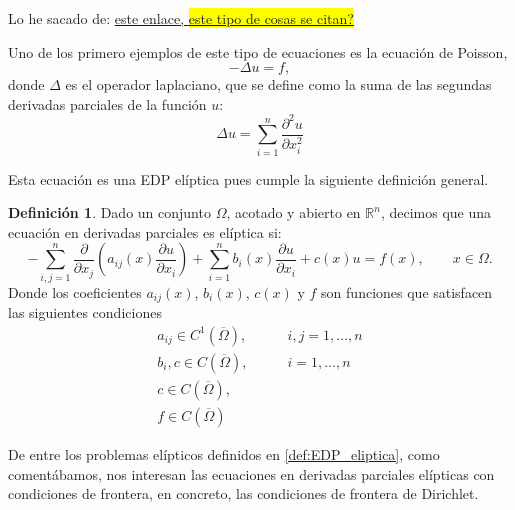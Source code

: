 \documentclass[a4paper,11pt,spanish, twoside, leqno]{tfg-uam}
\theoremstyle{definition}
\newtheorem{defin}[teor]{Definici\'on}
\begin{document}
Lo he sacado de: \href{https://www.ugr.es/~prodelas/ftp/ETSICCP/Resoluci%F3nNum%E9ricaEDPs.pdf}{este enlace, \colorbox{yellow}{este tipo de cosas se citan?}}


Uno de los primero ejemplos de este tipo de ecuaciones es la ecuación de Poisson,
\begin{equation*}
    -\Delta  u = f,
\end{equation*}
donde $\Delta$ es el operador laplaciano, que se define como la suma de las segundas derivadas parciales de la función $u$:
\begin{equation*}
    \Delta u = \sum_{i=1}^{n}\frac{\partial^2 u}{\partial x_i^2}
\end{equation*}

Esta ecuación es una EDP elíptica pues cumple la siguiente definición general.


\begin{mdframed}
\begin{defin}
    Dado un conjunto $\Omega$, acotado y abierto en $\mathbb{R}^n$, decimos que una ecuación en derivadas parciales es elíptica si:
    \begin{equation}
        -\sum_{i,j=1}^{n} \frac{\partial}{\partial x_j}\left( a_{ij}(x)\frac{\partial u}{\partial x_i}\right) + \sum_{i=1}^{n} b_i(x)\frac{\partial u}{\partial x_i} + c(x)u = f(x), \qquad x\in\Omega.
    \end{equation}
    Donde los coeficientes $a_{ij}(x)$, $b_i(x)$, $c(x)$ y $f$ son funciones que satisfacen las siguientes condiciones
    \begin{align}
        a_{ij} \in C^1(\overline{\Omega}),& \qquad i,j = 1, \dots ,n \\
        b_i, c \in C(\overline{\Omega}),& \qquad i = 1, \dots ,n \\
        c \in C(\overline{\Omega}),& \\
        f\in C(\overline{\Omega})&
    \end{align}
\end{defin}
\end{mdframed}

De entre los problemas elípticos definidos en \ref{def:EDP_eliptica}, como comentábamos, nos interesan las ecuaciones en derivadas parciales elípticas con condiciones de frontera, en concreto, las condiciones de frontera de Dirichlet.
\end{document}
